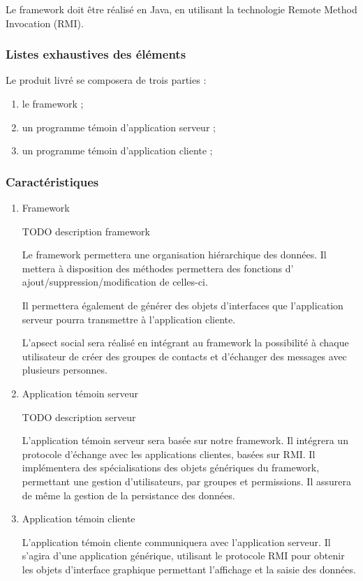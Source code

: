 Le framework doit être réalisé en Java, en utilisant la technologie Remote Method Invocation (RMI).

\subsubsection{Listes exhaustives des éléments} 
Le produit livré se composera de trois parties :
\begin{enumerate}
 \item le framework ;
 \item un programme témoin d'application serveur ;
 \item un programme témoin d'application cliente ;
\end{enumerate}

\subsubsection{Caractéristiques}
\begin{enumerate}
 \item Framework

TODO description framework

Le framework permettera une organisation hiérarchique des données.
Il mettera à disposition des méthodes permettera des fonctions d' ajout/suppression/modification de celles-ci.

Il permettera également de générer des objets d'interfaces que l'application serveur pourra transmettre à l'application cliente.

L'apsect social sera réalisé en intégrant au framework la possibilité à chaque utilisateur de créer des groupes de contacts et d'échanger des messages avec plusieurs personnes.

 \item Application témoin serveur

TODO description serveur

L'application témoin serveur sera basée sur notre framework.
Il intégrera un protocole d'échange avec les applications clientes, basées sur RMI.
Il implémentera des spécialisations des objets génériques du framework, permettant une gestion d'utilisateurs, par groupes et permissions.
Il assurera de même la gestion de la persistance des données.

 \item Application témoin cliente


L'application témoin cliente communiquera avec l'application serveur.
Il s'agira d'une application générique, utilisant le protocole RMI pour obtenir les objets
d'interface graphique permettant l'affichage et la saisie des données.
\end{enumerate}
